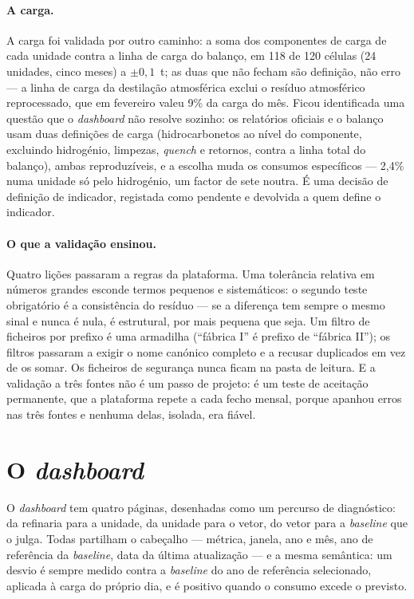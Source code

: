 \paragraph{A carga.} A carga foi validada por outro caminho: a soma dos
componentes de carga de cada unidade contra a linha de carga do balanço,
em 118 de 120 células (24 unidades, cinco meses) a $\pm0{,}1$~t; as duas
que não fecham são definição, não erro --- a linha de carga da destilação
atmosférica exclui o resíduo atmosférico reprocessado, que em fevereiro
valeu 9\% da carga do mês. Ficou identificada uma questão que o
\emph{dashboard} não resolve sozinho: os relatórios oficiais e o balanço
usam duas definições de carga (hidrocarbonetos ao nível do componente,
excluindo hidrogénio, limpezas, \emph{quench} e retornos, contra a linha
total do balanço), ambas reproduzíveis, e a escolha muda os consumos
específicos --- 2,4\% numa unidade só pelo hidrogénio, um factor de sete
noutra. É uma decisão de definição de indicador, registada como pendente
e devolvida a quem define o indicador.

\paragraph{O que a validação ensinou.} Quatro lições passaram a regras
da plataforma. Uma tolerância relativa em números grandes esconde termos
pequenos e sistemáticos: o segundo teste obrigatório é a consistência do
resíduo --- se a diferença tem sempre o mesmo sinal e nunca é nula, é
estrutural, por mais pequena que seja. Um filtro de ficheiros por prefixo
é uma armadilha (``fábrica I'' é prefixo de ``fábrica II''); os filtros
passaram a exigir o nome canónico completo e a recusar duplicados em vez
de os somar. Os ficheiros de segurança nunca ficam na pasta de leitura. E
a validação a três fontes não é um passo de projeto: é um teste de
aceitação permanente, que a plataforma repete a cada fecho mensal, porque
apanhou erros nas três fontes e nenhuma delas, isolada, era fiável.

\section{O \emph{dashboard}}
\label{sec:dashboard}

O \emph{dashboard} tem quatro páginas, desenhadas como um percurso de
diagnóstico: da refinaria para a unidade, da unidade para o vetor, do
vetor para a \emph{baseline} que o julga. Todas partilham o cabeçalho
--- métrica, janela, ano e mês, ano de referência da \emph{baseline}, data
da última atualização --- e a mesma semântica: um desvio é sempre medido
contra a \emph{baseline} do ano de referência selecionado, aplicada à carga
do próprio dia, e é positivo quando o consumo excede o previsto.

